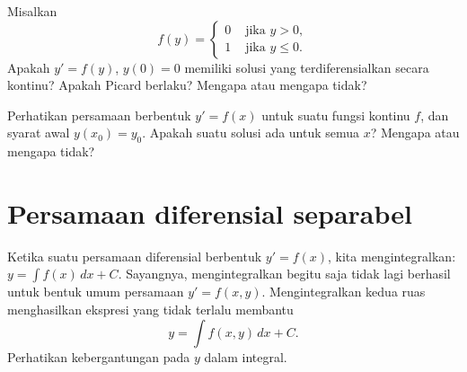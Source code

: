 \begin{exercise}[rumit]
Misalkan
\begin{equation*}
f(y) =
\begin{cases}
0 & \text{ jika $y > 0$}, \\
1 & \text{ jika $y \leq 0$} .
\end{cases}
\end{equation*}
Apakah $y' = f(y)$, $y(0) = 0$ memiliki solusi yang terdiferensialkan secara kontinu?  Apakah Picard berlaku?  Mengapa atau mengapa tidak?
\end{exercise}

\begin{exercise}
Perhatikan persamaan berbentuk $y' = f(x)$ untuk suatu fungsi kontinu
$f$, dan syarat awal $y(x_0) = y_0$.  Apakah suatu
solusi ada untuk semua $x$?  Mengapa atau mengapa tidak?
\end{exercise}


\sectionnewpage
\section{Persamaan diferensial separabel}
\label{separable:section}



Ketika suatu persamaan diferensial berbentuk
$y' = f(x)$,
kita mengintegralkan:
$y = \int f(x) \,dx + C$.
Sayangnya, mengintegralkan begitu saja tidak lagi berhasil untuk
bentuk umum persamaan
$y' = f(x,y)$.
Mengintegralkan kedua ruas menghasilkan ekspresi yang tidak terlalu membantu
\begin{equation*}
y = \int f(x,y) \,dx + C .
\end{equation*}
Perhatikan kebergantungan pada $y$ dalam integral.

